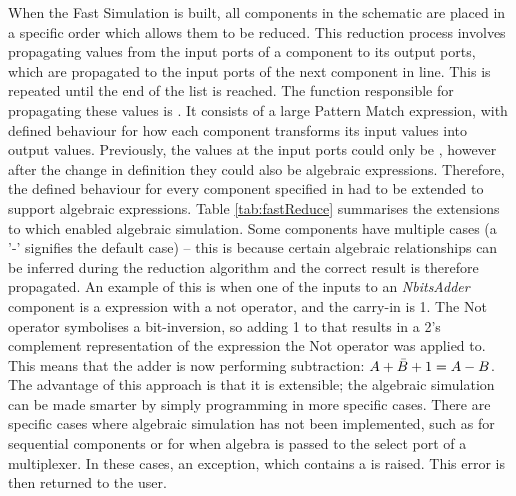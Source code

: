 When the Fast Simulation is built, all components in the schematic are placed in a specific order which allows them to be reduced. This reduction process involves propagating values from the input ports of a component to its output ports, which are propagated to the input ports of the next component in line. This is repeated until the end of the list is reached.
The function responsible for propagating these values is . It consists of a large Pattern Match expression, with defined behaviour for how each component transforms its input values into output values. Previously, the values at the input ports could only be , however after the change in definition they could also be algebraic expressions. Therefore, the defined behaviour for every component specified in  had to be extended to support algebraic expressions. Table \ref{tab:fastReduce} summarises the extensions to  which enabled algebraic simulation. Some components have multiple cases (a '-' signifies the default case) -- this is because certain algebraic relationships can be inferred during the reduction algorithm and the correct result is therefore propagated. An example of this is when one of the inputs to an \textit{NbitsAdder} component is a expression with a not operator, and the carry-in is 1. The Not operator symbolises a bit-inversion, so adding 1 to that results in a 2's complement representation of the expression the Not operator was applied to. This means that the adder is now performing subtraction: $A + \Bar{B} + 1 = A - B$. The advantage of this approach is that it is extensible; the algebraic simulation can be made smarter by simply programming in more specific cases. There are specific cases where algebraic simulation has not been implemented, such as for sequential components or for when algebra is passed to the select port of a multiplexer. In these cases, an  exception, which contains a  is raised. This error is then returned to the user.

